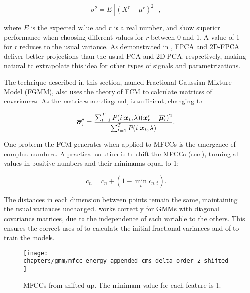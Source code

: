 \begin{equation}
    \sigma^2 = E[(X^r - \mu^r)^2],
    \label{eq:frac-variance}
\end{equation}

\noindent where $E$ is the expected value and $r$ is a real number, and show superior performance when choosing different values for $r$ between 0 and 1. A value of 1 for $r$ reduces  to the usual variance. As demonstrated in , FPCA and 2D-FPCA deliver better projections than the usual PCA and 2D-PCA, respectively, making natural to extrapolate this idea for other types of signals and parametrizations.

The technique described in this section, named Fractional Gaussian Mixture Model (FGMM), also uses the theory of FCM to calculate matrices of covariances. As the matrices are diagonal,  is sufficient, changing  to

\begin{equation}
    \overline{\dvec{\sigma}}_i^2 = \frac{\sum_{t=1}^T \postprob{i}{\dvec{x}_t, \lambda} (\dvec{x}_t^r - \overline{\dvec{\mu}}_i^r)^2}{\sum_{t=1}^T \postprob{i}{\dvec{x}_t, \lambda}}.
    \label{eq:m-step-frac-variances}
\end{equation}

\noindent One problem the FCM generates when applied to MFCCs is the emergence of complex numbers. A practical solution is to shift the MFCCs (see ), turning all values in positive numbers and their minimums equal to 1:

\begin{equation}
    c_n = c_n + (1 - \min_t c_{n,t}).
    \label{eq:mfccs-shift-up}
\end{equation}

\noindent The distances in each dimension between points remain the same, maintaining the usual variances unchanged.  works correctly for GMMs with diagonal covariance matrices, due to the independence of each variable to the others. This ensures the correct uses of  to calculate the initial fractional variances and of  to train the models.

\begin{figure}[ht]
    \centering
    \texttt{[image: chapters/gmm/mfcc\_energy\_appended\_cms\_delta\_order\_2\_shifted]}
    \caption{MFCCs from  shifted up. The minimum value for each feature is 1.}
    \label{fig:mfcc-shifted}
\end{figure}

